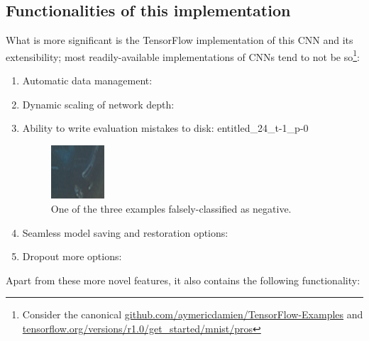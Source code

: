 \documentclass[a4paper, 11pt]{article} %
\begin{document}
	\subsection{Functionalities of this implementation}
		What is more significant is the TensorFlow implementation 
		of 
		this CNN and its
		extensibility; most readily-available implementations of CNNs tend to 
		not 
		be so\footnote{Consider the canonical
		\hyperlink{https://github.com/aymericdamien/TensorFlow-Examples}
		{github.com/aymericdamien/TensorFlow-Examples} and 
		\hyperlink{https://www.tensorflow.org/versions/r1.0/get\_started/mnist/pros}
		{tensorflow.org/versions/r1.0/get\_started/mnist/pros}}:
		\begin{enumerate}
			\item Automatic data management:
			\item Dynamic scaling of network depth:
			\item Ability to write evaluation mistakes to disk: 
			entitled\_24\_t-1\_p-0
			\begin{figure}[H]
				\centering
				\includegraphics[width=2cm]{figures/mistake_example}
				\caption{One of the three examples falsely-classified as 
				negative.}
			\end{figure}
			\item Seamless model saving and restoration options:
			\item Dropout more options: \cite{dropout}\relax 
		\end{enumerate}
		Apart from these more novel features, it also contains the following 
		functionality:
\end{document}
